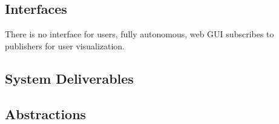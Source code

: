 \subsection{Interfaces}
\label{sec:interfaces}

There is no interface for users, fully autonomous, web GUI subscribes to
publishers for user visualization.
\par

\subsection{System Deliverables}
\label{sec:deliverables}

\subsection{Abstractions}
\label{sec:abstractions}

